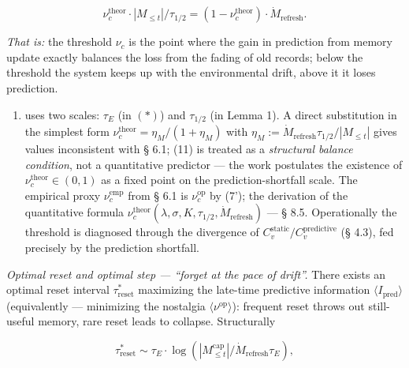 \documentclass[pdflatex,sn-mathphys-ay]{sn-jnl}
\providecommand{\tightlist}{\setlength{\itemsep}{0pt}\setlength{\parskip}{0pt}}
\begin{document}
\begin{equation}\nu_c^{\text{theor}} \cdot |M_{\le t}| / \tau_{1/2} = (1 - \nu_c^{\text{theor}}) \cdot \dot{M}_{\text{refresh}}. \tag{11}\end{equation}



\emph{That is:} the threshold \(\nu_c\) is the point where the gain in prediction from memory update exactly balances the loss from the fading of old records; below the threshold the system keeps up with the environmental drift, above it it loses prediction.



\begin{enumerate}

\def\labelenumi{(\arabic{enumi})}

\setcounter{enumi}{10}

\tightlist

\item

  uses two scales: \(\tau_E\) (in \((*)\)) and \(\tau_{1/2}\) (in Lemma 1). A direct substitution in the simplest form \(\nu_c^{\text{theor}} = \eta_M/(1+\eta_M)\) with \(\eta_M := \dot{M}_{\text{refresh}} \tau_{1/2} / |M_{\le t}|\) gives values inconsistent with § 6.1; (11) is treated as a \emph{structural balance condition}, not a quantitative predictor --- the work postulates the existence of \(\nu_c^{\text{theor}} \in (0, 1)\) as a fixed point on the prediction-shortfall scale. The empirical proxy \(\nu_c^{\text{emp}}\) from § 6.1 is \(\nu_c^{\text{op}}\) by (7'); the derivation of the quantitative formula \(\nu_c^{\text{theor}}(\lambda, \sigma, K, \tau_{1/2}, \dot M_{\text{refresh}})\) --- § 8.5. Operationally the threshold is diagnosed through the divergence of \(C_v^{\text{static}}/C_v^{\text{predictive}}\) (§ 4.3), fed precisely by the prediction shortfall.

\end{enumerate}



\emph{Optimal reset and optimal step --- ``forget at the pace of drift''.} There exists an optimal reset interval \(\tau_{\text{reset}}^*\) maximizing the late-time predictive information \(\langle I_{\text{pred}} \rangle\) (equivalently --- minimizing the nostalgia \(\langle\nu^{\text{op}}\rangle\)): frequent reset throws out still-useful memory, rare reset leads to collapse. Structurally



\begin{equation}\tau_{\text{reset}}^* \sim \tau_E \cdot \log(|M_{\le t}^{\text{cap}}|/\dot{M}_{\text{refresh}} \tau_E), \tag{12}\end{equation}
\end{document}
